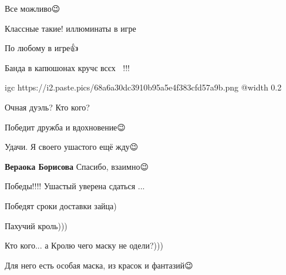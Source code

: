\begin{itemize} %

Все можливо😉
\end{itemize} %


Классные такие! иллюминаты в игре 💪

\begin{itemize} %

По любому в игре👍🐇😉


Банда в капюшонах кручє всєх 💪😎!!!


\ifcmt
  igc https://i2.paste.pics/68a6a30dc3910b95a5e4f383cfd57a9b.png
	@width 0.2
\fi

\end{itemize} %


Очная дуэль? Кто кого?

\begin{itemize} %

Победит дружба и вдохновение😉🐇


Удачи. Я своего ушастого ещё жду😉

\textbf{Вераока Борисова} Спасибо, взаимно😉


Победы!!!! Ушастый уверена сдаться ...


Победят сроки доставки зайца)
\end{itemize} %


Пахучий кроль)))


Кто кого... а Кролю чего маску не одели?)))

\begin{itemize} %

Для него есть особая маска, из красок и фантазий😉🐰
\end{itemize} %
